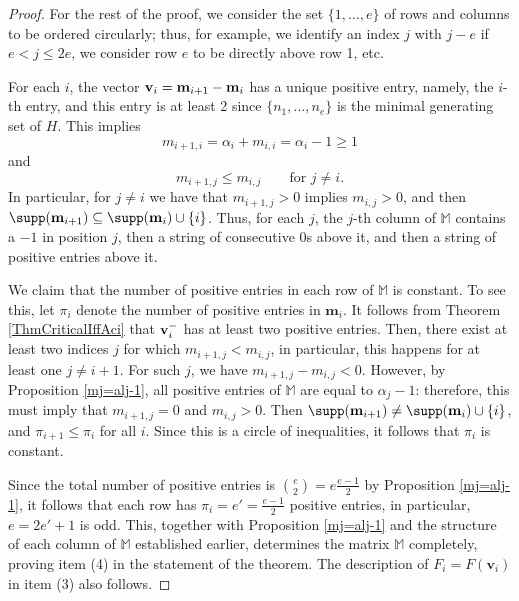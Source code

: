 \documentclass[11pt,twoside]{amsart}
\newcommand{\MM}{\mathbb M}
\def\bv{{\mathbf v}}
\def\bm{{\mathbf m}}
\def\bbM{{\mathbb M}}
\theoremstyle{definition}
\numberwithin{equation}{section}
\begin{document}
\begin{proof}
For the rest of the proof, we consider the set $\{1, \ldots, e\}$ of rows and columns to be ordered circularly; thus, for example, we identify an index $j$ with $j-e$ if  $e < j \leq 2e$,
we consider row $e$ to be directly above row 1, etc.  

For each $i$,
the vector  ${\bf v}_i={\bf m}_{i+1}-{\bf m}_i$
 has a unique positive entry, namely, the $i$-th entry,
 and this entry is at least 2 since $\{n_1, \ldots, n_e\}$  is the minimal generating set of $H$.
This implies 
\begin{equation}\label{EqEndCircle}
m_{i+1,i} = \alpha_i + m_{i,i} = \alpha_i-1 \ge 1
\end{equation}
and
\begin{equation}\label{EqCircular}
 m_{i+1,j} \leq m_{i,j} \qquad \text{for  }j \ne i.
\end{equation}
In particular, for $j \ne i$ we have that $m_{i+1,j}>0$ implies $m_{i,j}>0$, and then $\supp(\bm_{i+1}) \subseteq \supp(\bm_i) \cup \{i\}$.
Thus, for each $j$,  the $j$-th column of $\bbM$  contains a $-1$ in position $j$, then a string of consecutive 0s above it, and then a string of positive entries above it.



We claim that 
 the number of positive entries in each row of $\bbM$ is constant.
To see this, let $\pi_i$ denote the number of positive entries in $\bm_i$. 
It follows from Theorem \ref{ThmCriticalIffAci} that 
 ${\bf v}_i^-$ has at least two positive entries.
 Then, there exist at least two indices $j$ for which $m_{i+1,j}<m_{i,j}$,
 in particular, this happens for at least one $j \ne i+1$. For such $j$, we have $m_{i+1,j}-m_{i,j} < 0$. However, by Proposition \ref{mj=alj-1}, all positive entries of $\MM$ are equal to $\alpha_j-1$: therefore, this must imply that $m_{i+1,j}=0$ and $m_{i,j} > 0$. Then $\supp(\bm_{i+1}) \ne \supp(\bm_i) \cup \{i\}$, and $\pi_{i+1}\leq \pi_i$ for all $i$. Since this is a circle of inequalities, it follows that $\pi_i$ is constant.
 
Since the total number of positive entries is ${e \choose 2}= e\frac{e-1}{2}$ by Proposition \ref{mj=alj-1}, it follows that each row has $\pi_i = e'=\frac{e-1}{2}$ positive entries, in particular, $e = 2e'+1$ is odd.
This, together with Proposition \ref{mj=alj-1} and the structure of each column of  $\bbM$ established earlier, 
determines the matrix $\bbM$ completely, proving item (4) in the statement of the theorem. 
The description of $F_i=F(\bv_i)$ in item (3) also follows.


\end{proof}
\end{document}
